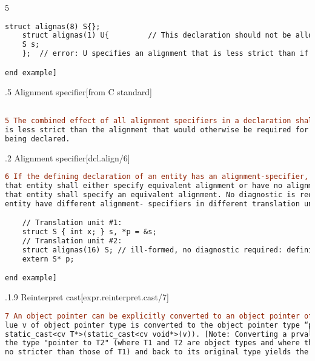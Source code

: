 \documentclass[11pt]{article}
\begin{document}
\begin{thebibliography}{5}
\begin{lstlisting}[language=diff]
    struct alignas(8) S{};
    struct alignas(1) U{         // This declaration should not be allowed
    S s;
    };  // error: U specifies an alignment that is less strict than if the alignas(1) were omitted. 

end example]
    \end{lstlisting}

    \hypertarget{6.7.5}{}   
    .5 Alignment specifier\hspace*{0pt}\hfill [from C standard]
    
\begin{lstlisting}[language=diff]

5 The combined effect of all alignment specifiers in a declaration shall not specify an alignment that
is less strict than the alignment that would otherwise be required for the type of the object or member
being declared.

\end{lstlisting}

    \hypertarget{9.12.2/6}{}   
    .2 Alignment specifier\hspace*{0pt}\hfill [dcl.align/6]
    \newline
\begin{lstlisting}[language=diff]
6 If the defining declaration of an entity has an alignment-specifier, any non-defining declaration of
that entity shall either specify equivalent alignment or have no alignment-specifier.         Conversely, if any declaration of an entity has an alignment-specifier, every defining declaration of 
that entity shall specify an equivalent alignment. No diagnostic is required if declarations of an 
entity have different alignment- specifiers in different translation units. [Example:

    // Translation unit #1:
    struct S { int x; } s, *p = &s;
    // Translation unit #2:
    struct alignas(16) S; // ill-formed, no diagnostic required: definition of S lacks alignment
    extern S* p;

end example]
\end{lstlisting}

    \hypertarget{7.6.1.9/7}{}   
    .1.9 Reinterpret cast\hspace*{0pt}\hfill [expr.reinterpret.cast/7]
    \newline
    \begin{lstlisting}[language=diff]
7 An object pointer can be explicitly converted to an object pointer of a different type.65 When a prva-
lue v of object pointer type is converted to the object pointer type “pointer to cv T”, the result is 
static_cast<cv T*>(static_cast<cv void*>(v)). [Note: Converting a prvalue of type “pointer to T1” to 
the type "pointer to T2" (where T1 and T2 are object types and where the alignment requirements of T2 are 
no stricter than those of T1) and back to its original type yields the original pointer value. end note]
    \end{lstlisting}
    

\end{thebibliography}
\end{document}
